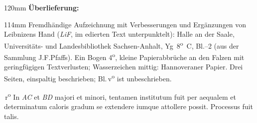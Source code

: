 %
\frenchspacing%
\begin{ledgroupsized}[r]{120mm}%
\footnotesize%
\pstart%
\noindent\textbf{Überlieferung:}%
\pend%
\end{ledgroupsized}%
\begin{ledgroupsized}[r]{114mm}%
\footnotesize%
\pstart%
\parindent -6mm%
%
Fremdhändige Aufzeichnung mit Verbesserungen und Ergänzungen von Leibnizens Hand 
(\textit{LiF}, im edierten Text unterpunktelt):
Halle an der Saale, Universitäts- und Landesbibliothek Sachsen-Anhalt, Yg~8\textsuperscript{o}~C, Bl.--2
(aus der Sammlung J.\:F.\;Pfaffs).
Ein Bogen 4\textsuperscript{o},
kleine Papierabbrüche an den Falzen mit geringfügigen Textverlusten;
Wasserzeichen mittig: Hannoveraner Papier. %
Drei Seiten, einspaltig beschrieben;
Bl.\,v\textsuperscript{o} ist unbeschrieben.
\pend%
\end{ledgroupsized}%
%
\frenchspacing%
\vspace{8mm}%
\normalsize%
\pstart%
\noindent%
\,r\textsuperscript{o}\rbrack%
\phantom{Junii 1698}%
\hfill%
%
\pend%
\pstart%
\noindent%
In
\textit{AC} et \textit{BD} majori et minori,
tentamen%
 institutum fuit
per aequalem et determinatum caloris gradum%
%
se extendere%
%
\mercury iumque%
attollere possit.
Processus fuit talis.%
%
\pend%
\pstart%
